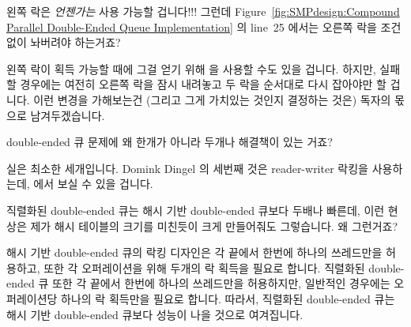 \begin{enumerate}
\QuickQ{}
	왼쪽 락은 \emph{언젠가는} 사용 가능할 겁니다!!!
	그런데
	Figure~\ref{fig:SMPdesign:Compound Parallel Double-Ended Queue Implementation}
	의 line~25 에서는 오른쪽 락을 조건없이 놔버려야 하는거죠?

\QuickA{}
	왼쪽 락이 획득 가능할 때에 그걸 얻기 위해  을 사용할
	수도 있을 겁니다.
	하지만, 실패할 경우에는 여전히 오른쪽 락을 잠시 내려놓고 두 락을
	순서대로 다시 잡아야만 할 겁니다.
	이런 변경을 가해보는건 (그리고 그게 가치있는 것인지 결정하는 것은)
	독자의 몫으로 남겨두겠습니다.

\QuickQ{}
	double-ended 큐 문제에 왜 한개가 아니라 두개나 해결책이 있는 거죠?

\QuickA{}
	실은 최소한 세개입니다.
	Domink Dingel 의 세번째 것은 reader-writer 락킹을 사용하는데,
	 에서 보실 수 있을 겁니다.

\QuickQ{}
	직렬화된 double-ended 큐는 해시 기반 double-ended 큐보다 두배나 빠른데,
	이런 현상은 제가 해시 테이블의 크기를 미친듯이 크게 만들어줘도
	그렇습니다.
	왜 그런거죠?

\QuickA{}
	해시 기반 double-ended 큐의 락킹 디자인은 각 끝에서 한번에 하나의
	쓰레드만을 허용하고, 또한 각 오퍼레이션을 위해 두개의 락 획득을 필요로
	합니다.
	직렬화된 double-ended  큐 또한 각 끝에서 한번에 하나의 쓰레드만을
	허용하지만, 일반적인 경우에는 오퍼레이션당 하나의 락 획득만을 필요로
	합니다.
	따라서, 직렬화된 double-ended 큐는 해시 기반 double-ended 큐보다 성능이
	나을 것으로 여겨집니다.


\end{enumerate}
